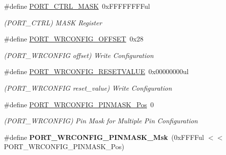 \begin{DoxyCompactItemize}
\item 
\hypertarget{group___s_a_m_l21___p_o_r_t_ga9c5aed68de5b7c9dd9239edbd64af23b}{}\#define \hyperlink{group___s_a_m_l21___p_o_r_t_ga9c5aed68de5b7c9dd9239edbd64af23b}{P\+O\+R\+T\+\_\+\+C\+T\+R\+L\+\_\+\+M\+A\+S\+K}~0x\+F\+F\+F\+F\+F\+F\+F\+Ful\label{group___s_a_m_l21___p_o_r_t_ga9c5aed68de5b7c9dd9239edbd64af23b}

\begin{DoxyCompactList}\small\item\em (P\+O\+R\+T\+\_\+\+C\+T\+R\+L) M\+A\+S\+K Register \end{DoxyCompactList}\item 
\hypertarget{group___s_a_m_l21___p_o_r_t_ga9d707b59cf1ecab326071c79a1334f67}{}\#define \hyperlink{group___s_a_m_l21___p_o_r_t_ga9d707b59cf1ecab326071c79a1334f67}{P\+O\+R\+T\+\_\+\+W\+R\+C\+O\+N\+F\+I\+G\+\_\+\+O\+F\+F\+S\+E\+T}~0x28\label{group___s_a_m_l21___p_o_r_t_ga9d707b59cf1ecab326071c79a1334f67}

\begin{DoxyCompactList}\small\item\em (P\+O\+R\+T\+\_\+\+W\+R\+C\+O\+N\+F\+I\+G offset) Write Configuration \end{DoxyCompactList}\item 
\hypertarget{group___s_a_m_l21___p_o_r_t_ga1962785a10daf1e85b2bab4203bc0f30}{}\#define \hyperlink{group___s_a_m_l21___p_o_r_t_ga1962785a10daf1e85b2bab4203bc0f30}{P\+O\+R\+T\+\_\+\+W\+R\+C\+O\+N\+F\+I\+G\+\_\+\+R\+E\+S\+E\+T\+V\+A\+L\+U\+E}~0x00000000ul\label{group___s_a_m_l21___p_o_r_t_ga1962785a10daf1e85b2bab4203bc0f30}

\begin{DoxyCompactList}\small\item\em (P\+O\+R\+T\+\_\+\+W\+R\+C\+O\+N\+F\+I\+G reset\+\_\+value) Write Configuration \end{DoxyCompactList}\item 
\hypertarget{group___s_a_m_l21___p_o_r_t_gab1a78a8f36fb7fceed5ec4b2f821670e}{}\#define \hyperlink{group___s_a_m_l21___p_o_r_t_gab1a78a8f36fb7fceed5ec4b2f821670e}{P\+O\+R\+T\+\_\+\+W\+R\+C\+O\+N\+F\+I\+G\+\_\+\+P\+I\+N\+M\+A\+S\+K\+\_\+\+Pos}~0\label{group___s_a_m_l21___p_o_r_t_gab1a78a8f36fb7fceed5ec4b2f821670e}

\begin{DoxyCompactList}\small\item\em (P\+O\+R\+T\+\_\+\+W\+R\+C\+O\+N\+F\+I\+G) Pin Mask for Multiple Pin Configuration \end{DoxyCompactList}\item 
\hypertarget{group___s_a_m_l21___p_o_r_t_ga55c432605b18507992b4540265c1768a}{}\#define {\bfseries P\+O\+R\+T\+\_\+\+W\+R\+C\+O\+N\+F\+I\+G\+\_\+\+P\+I\+N\+M\+A\+S\+K\+\_\+\+Msk}~(0x\+F\+F\+F\+Ful $<$$<$ P\+O\+R\+T\+\_\+\+W\+R\+C\+O\+N\+F\+I\+G\+\_\+\+P\+I\+N\+M\+A\+S\+K\+\_\+\+Pos)\label{group___s_a_m_l21___p_o_r_t_ga55c432605b18507992b4540265c1768a}


\end{DoxyCompactItemize}
